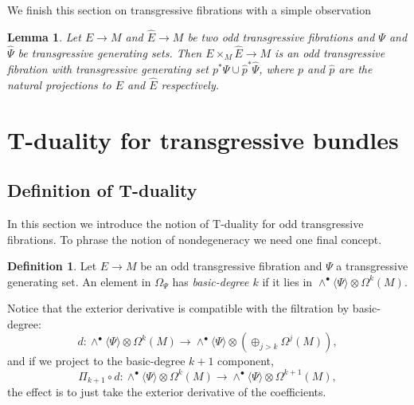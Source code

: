 \documentclass[12pt,twoside]{article}
\theoremstyle{plain}
\newtheorem{lemma}[theorem]{Lemma}%
\theoremstyle{definition}
\newtheorem{definition}[theorem]{Definition}
\newcommand{\tensor}{\otimes}
\newcommand{\IP}[1]{\langle #1 \rangle}
\numberwithin{equation}{section}
\begin{document}
We finish this section on transgressive fibrations with a simple observation
\begin{lemma}
Let $E \to M$ and $\hat{E}\to M$ be two odd transgressive fibrations and $\Psi$ and $\hat{\Psi}$ be transgressive generating sets. Then $E \times _M \hat{E} \to M$ is an odd transgressive fibration with transgressive generating set  $p^*\Psi \cup \hat{p}^*\hat\Psi$, where $p$ and $\hat{p}$ are the natural projections to $E$ and $\hat{E}$ respectively.
\end{lemma}

\section{T-duality for transgressive bundles}


\subsection{Definition of T-duality}

In this section we introduce the notion of T-duality for odd transgressive fibrations. To phrase the notion of nondegeneracy we need one final concept.

\begin{definition}
Let $E\to M$ be an odd transgressive fibration and $\Psi$ a transgressive generating set. An element in $\Omega_\Psi$ has \emph{basic-degree $k$} if it lies in  $\wedge^\bullet\IP{\Psi}\tensor \Omega^k(M)$.   
\end{definition}
Notice that the exterior derivative  is compatible with the filtration by basic-degree:
\[d \colon\wedge^\bullet\IP{\Psi} \tensor  \Omega^k(M)  \to\wedge^\bullet\IP{\Psi} \tensor ( \oplus_{j>k}\Omega^j(M)) ,\]
and if we project to the basic-degree $k+1$ component, 
\[ \Pi_{k+1}\circ d \colon \wedge^\bullet\IP{\Psi} \tensor  \Omega^k(M) \to \wedge^\bullet\IP{\Psi} \tensor  \Omega^{k+1}(M),\]
the effect is to just take the exterior derivative of the coefficients.
\end{document}
